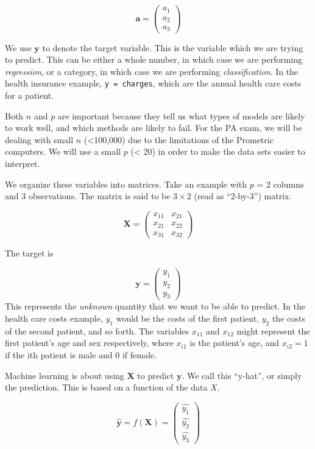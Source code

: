 \documentclass[]{book}
\begin{document}
\[\mathbf{a} = \begin{pmatrix} a_1 \\ a_2 \\ a_3 \end{pmatrix}\]

We use \(\mathbf{y}\) to denote the target variable. This is the variable which we are trying to predict. This can be either a whole number, in which case we are performing \emph{regression}, or a category, in which case we are performing \emph{classification}. In the health insurance example, \texttt{y\ =\ charges}, which are the annual health care costs for a patient.

Both \(n\) and \(p\) are important because they tell us what types of models are likely to work well, and which methods are likely to fail. For the PA exam, we will be dealing with small \(n\) (\textless100,000) due to the limitations of the Prometric computers. We will use a small \(p\) (\textless{} 20) in order to make the data sets easier to interpret.

We organize these variables into matrices. Take an example with \(p\) = 2 columns and 3 observations. The matrix is said to be \(3 \times 2\) (read as ``2-by-3'') matrix.

\[
\mathbf{X} = \begin{pmatrix}x_{11} & x_{21}\\
x_{21} & x_{22}\\
x_{31} & x_{32}
\end{pmatrix}
\]

The target is

\[\mathbf{y} = \begin{pmatrix} y_1 \\ y_2 \\ y_3 \end{pmatrix}\]
This represents the \emph{unknown} quantity that we want to be able to predict. In the health care costs example, \(y_1\) would be the costs of the first patient, \(y_2\) the costs of the second patient, and so forth. The variables \(x_{11}\) and \(x_{12}\) might represent the first patient's age and sex respectively, where \(x_{i1}\) is the patient's age, and \(x_{i2} = 1\) if the ith patient is male and 0 if female.

Machine learning is about using \(\mathbf{X}\) to predict \(\mathbf{y}\). We call this ``y-hat'', or simply the prediction. This is based on a function of the data \(X\).

\[\mathbf{\hat{y}} = f(\mathbf{X}) = \begin{pmatrix} \hat{y_1} \\ \hat{y_2} \\ \hat{y_3} \end{pmatrix}\]
\end{document}
